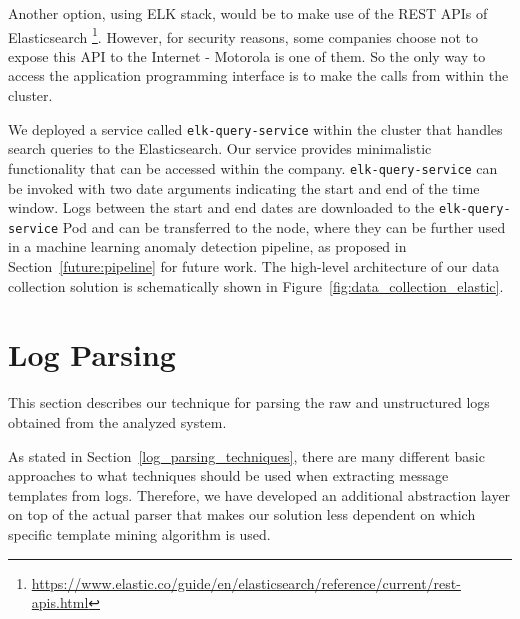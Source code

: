 Another option, using ELK stack, would be to make use of the REST APIs of Elasticsearch \footnote{\url{https://www.elastic.co/guide/en/elasticsearch/reference/current/rest-apis.html}}. However, for security reasons, some companies choose not to expose this API to the Internet - Motorola is one of them.
So the only way to access the application programming interface is to make the calls from within the cluster.

We deployed a service called \texttt{elk-query-service} within the cluster that handles search queries to the Elasticsearch. Our service provides minimalistic functionality that can be accessed within the company.
\texttt{\justify elk-query-service} can be invoked with two date arguments indicating the start and end of the time window. Logs between the start and end dates are downloaded to the \texttt{elk-query-service} Pod and can be transferred to the node, where they can be further used in a machine learning anomaly detection pipeline, as proposed in Section~\ref{future:pipeline} for future work. The high-level architecture of our data collection solution is schematically shown in Figure~\ref{fig:data_collection_elastic}.

\begin{figure}[!tbp] 
\end{figure}

\newpage

\section{Log Parsing}
This section describes our technique for parsing the raw and unstructured logs obtained from the analyzed system.

As stated in Section~\ref{log_parsing_techniques}, there are many different basic approaches to what techniques should be used when extracting message templates from logs. 
Therefore, we have developed an additional abstraction layer on top of the actual parser that makes our solution less dependent on which specific template mining algorithm is used.

